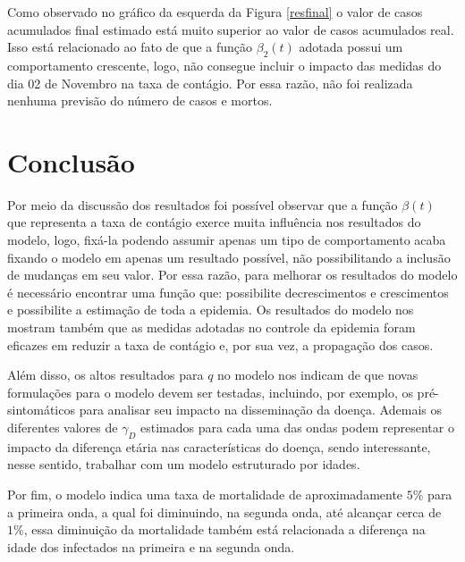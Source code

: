 \documentclass[12pt]{article}
\begin{document}
Como observado no gráfico da esquerda da Figura \ref{resfinal} o valor de casos acumulados final estimado está muito superior ao valor de casos acumulados real. Isso está relacionado ao fato de que a função $\beta_2(t)$ adotada possui um comportamento crescente, logo, não consegue incluir o impacto das medidas do dia 02 de Novembro na taxa de contágio. Por essa razão, não foi realizada nenhuma previsão do número de casos e mortos.

\section{Conclusão}

Por meio da discussão dos resultados foi possível observar que a função $\beta(t)$ que representa a taxa de contágio exerce muita influência nos resultados do modelo, logo, fixá-la podendo assumir apenas um tipo de comportamento acaba fixando o modelo em apenas um resultado possível, não possibilitando a inclusão de mudanças em seu valor. Por essa razão, para melhorar os resultados do modelo é necessário encontrar uma função que: possibilite decrescimentos e crescimentos e possibilite a estimação de toda a epidemia. Os resultados do modelo nos mostram também que as medidas adotadas no controle da epidemia foram eficazes em reduzir a taxa de contágio e, por sua vez, a propagação dos casos.

Além disso, os altos resultados para $q$ no modelo nos indicam de que novas formulações para o modelo devem ser testadas, incluindo, por exemplo, os pré-sintomáticos para analisar seu impacto na disseminação da doença. Ademais os diferentes valores de $\gamma_D$ estimados para cada uma das ondas podem representar o impacto da diferença etária nas características do doença, sendo interessante, nesse sentido, trabalhar com um modelo estruturado por idades.

Por fim, o modelo indica uma taxa de mortalidade de aproximadamente $5\%$ para a primeira onda, a qual foi diminuindo, na segunda onda, até alcançar cerca de $1\%$, essa diminuição da mortalidade também está relacionada a diferença na idade dos infectados na primeira e na segunda onda.
\end{document}
